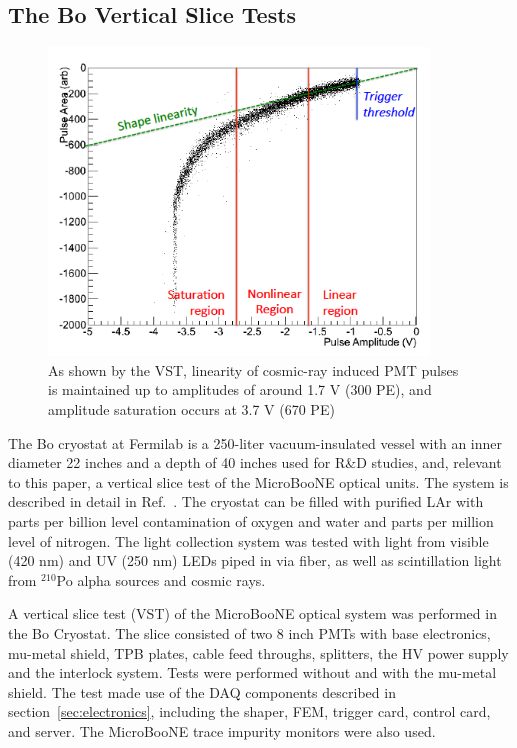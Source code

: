 \subsection{The Bo Vertical Slice Tests}

\begin{figure}[t]
\centering 
\includegraphics[width=0.9\textwidth]{./light_figures/nonlinear.png}
\caption{\footnotesize As shown by the VST, linearity of cosmic-ray induced PMT pulses is maintained up to amplitudes of around 1.7 V (300 PE), and amplitude saturation occurs at 3.7 V (670 PE) \cite{Benthesis}
 \label{fig:nonlinear}  }
\end{figure}

The Bo cryostat at Fermilab is a 250-liter vacuum-insulated vessel with an inner diameter 22 inches and a depth of 40 inches used for R\&D studies, and, relevant to this paper, a vertical slice test of the MicroBooNE optical units.  The system is described in detail in Ref.~\cite{Benthesis}.  The cryostat can be filled with purified LAr with parts per billion level contamination of oxygen and water and parts per million level of nitrogen.  The light collection system was tested with light from visible (420 nm) and UV (250 nm) LEDs piped in via fiber, as well as scintillation light from $^{210}$Po alpha sources and cosmic rays.

A vertical slice test (VST) of the MicroBooNE optical system was performed in the Bo Cryostat.  The slice consisted of two 8 inch PMTs with base electronics, mu-metal shield, TPB plates,  cable feed throughs, splitters, the HV power supply and the interlock system.   Tests were performed without and with the mu-metal shield.   The test made use of the DAQ components described in section~\ref{sec:electronics}, including the shaper, FEM, trigger card, control card, and server.  The MicroBooNE trace impurity monitors were also used.

